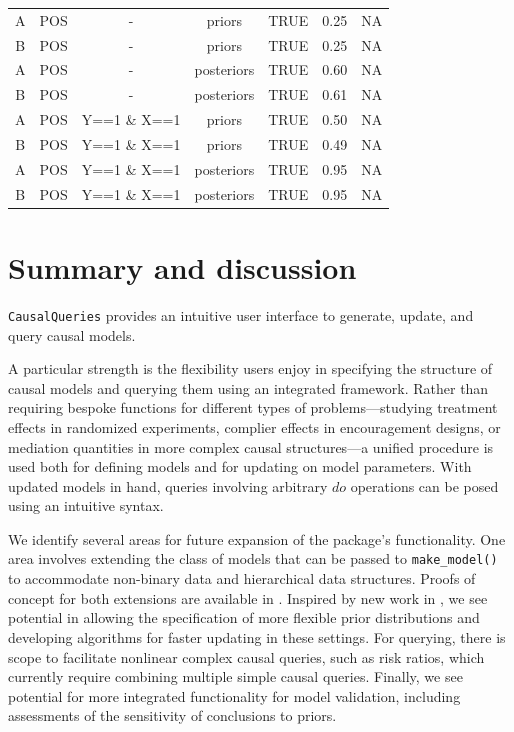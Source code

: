 \documentclass[
  11pt,
  article]{jss}
\begin{document}
\begin{longtable}[t]{ccccccc}
A & POS & - & priors & TRUE & 0.25 & NA\\
\addlinespace
B & POS & - & priors & TRUE & 0.25 & NA\\
A & POS & - & posteriors & TRUE & 0.60 & NA\\
B & POS & - & posteriors & TRUE & 0.61 & NA\\
A & POS & Y==1 \& X==1 & priors & TRUE & 0.50 & NA\\
B & POS & Y==1 \& X==1 & priors & TRUE & 0.49 & NA\\
\addlinespace
A & POS & Y==1 \& X==1 & posteriors & TRUE & 0.95 & NA\\
B & POS & Y==1 \& X==1 & posteriors & TRUE & 0.95 & NA\\
\bottomrule

\end{longtable}

\section{Summary and discussion}\label{summary-and-discussion}

\texttt{CausalQueries} provides an intuitive user interface to generate,
update, and query causal models.

A particular strength is the flexibility users enjoy in specifying the
structure of causal models and querying them using an integrated
framework. Rather than requiring bespoke functions for different types
of problems---studying treatment effects in randomized experiments,
complier effects in encouragement designs, or mediation quantities in
more complex causal structures---a unified procedure is used both for
defining models and for updating on model parameters. With updated
models in hand, queries involving arbitrary \(do\) operations can be
posed using an intuitive syntax.

We identify several areas for future expansion of the package's
functionality. One area involves extending the class of models that can
be passed to \texttt{make\_model()} to accommodate non-binary data and
hierarchical data structures. Proofs of concept for both extensions are
available in \citet{humphreys_integrated_2023}. Inspired by new work in
\citet{irons2023causally}, we see potential in allowing the
specification of more flexible prior distributions and developing
algorithms for faster updating in these settings. For querying, there is
scope to facilitate nonlinear complex causal queries, such as risk
ratios, which currently require combining multiple simple causal
queries. Finally, we see potential for more integrated functionality for
model validation, including assessments of the sensitivity of
conclusions to priors.
\end{document}
